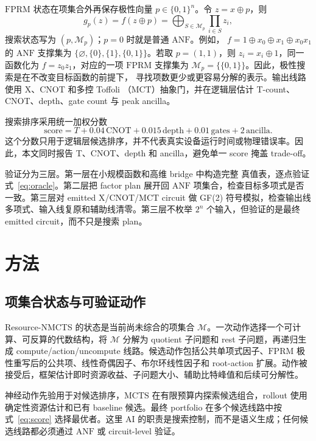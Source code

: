\documentclass[UTF8,fontset=fandol,11pt]{ctexart}
\newcommand{\method}{Resource-NMCTS}
\newcommand{\anf}{\ensuremath{\mathrm{ANF}}}
\newcommand{\fprm}{\ensuremath{\mathrm{FPRM}}}
\newcommand{\mcts}{\ensuremath{\mathrm{MCTS}}}
\newcommand{\xor}{\ensuremath{\oplus}}
\newcommand{\mct}{\ensuremath{\mathrm{MCT}}}
\newcommand{\score}{\ensuremath{\mathrm{score}}}
\newcommand{\ttable}{真值表}
\begin{document}
\fprm{} 状态在项集合外再保存极性向量 $p\in\{0,1\}^n$。令
$z=x\xor p$，则
\begin{equation}
g_p(z)=f(z\xor p)=\bigoplus_{S\in\mathcal{M}_p}\prod_{i\in S}z_i,
\label{eq:fprm-support-zh}
\end{equation}
搜索状态写为 $(p,\mathcal{M}_p)$；$p=0$ 时就是普通 \anf{}。例如，
$f=1\xor x_0\xor x_1\xor x_0x_1$ 的 \anf{} 支撑集为
$\{\varnothing,\{0\},\{1\},\{0,1\}\}$。若取 $p=(1,1)$，则
$z_i=x_i\xor1$，同一函数化为 $f=z_0z_1$，对应的一项 \fprm{} 支撑集为
$\mathcal{M}_p=\{\{0,1\}\}$。因此，极性搜索是在不改变目标函数的前提下，
寻找项数更少或更容易分解的表示。输出线路使用 X、CNOT 和多控 Toffoli
（\mct{}）抽象门，并在逻辑层估计 T-count、CNOT、depth、gate count 与
peak ancilla。

搜索排序采用统一加权分数
\begin{equation}
  \score = T + 0.04\,\mathrm{CNOT} + 0.015\,\mathrm{depth}
         + 0.01\,\mathrm{gates} + 2\,\mathrm{ancilla}.
  \label{eq:score}
\end{equation}
这个分数只用于逻辑层候选排序，并不代表真实设备运行时间或物理错误率。因此，本文同时报告 T、CNOT、depth 和 ancilla，避免单一 score 掩盖 trade-off。

验证分为三层。第一层在小规模函数和高维 bridge 中构造完整 \ttable{}，逐点验证式~\eqref{eq:oracle}。第二层把 factor plan 展开回 \anf{} 项集合，检查目标多项式是否一致。第三层对 emitted X/CNOT/\mct{} circuit 做 GF(2) 符号模拟，检查输出线多项式、输入线复原和辅助线清零。第三层不枚举 $2^n$ 个输入，但验证的是最终 emitted circuit，而不只是搜索 plan。

\section{方法}

\subsection{项集合状态与可验证动作}

\method{} 的状态是当前尚未综合的项集合 $\mathcal{M}$。一次动作选择一个可计算、可反算的代数结构，将 $\mathcal{M}$ 分解为 quotient 子问题和 rest 子问题，再递归生成 compute/action/uncompute 线路。候选动作包括公共单项式因子、\fprm{} 极性重写后的公共项、线性奇偶因子、布尔环线性因子和 root-action 扩展。动作被接受后，框架估计即时资源收益、子问题大小、辅助比特峰值和后续可分解性。

神经动作先验用于对候选排序，\mcts{} 在有限预算内探索候选组合，rollout 使用确定性资源估计和已有 baseline 候选。最终 portfolio 在多个候选线路中按式~\eqref{eq:score} 选择最优者。这里 AI 的职责是搜索控制，而不是语义生成；任何候选线路都必须通过 \anf{} 或 circuit-level 验证。
\end{document}
